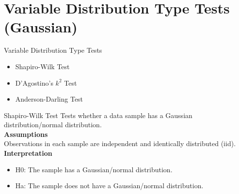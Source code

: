 


\maketitle
\section{Variable Distribution Type Tests (Gaussian)}

\begin{frame}[t]{Variable Distribution Type Tests}
	\begin{itemize}
		\item Shapiro-Wilk Test
		\item D’Agostino’s $k^{2}$ Test
		\item Anderson-Darling Test
	\end{itemize}
\end{frame}
\begin{frame}[t]{Shapiro-Wilk Test}
	Tests whether a data sample has a Gaussian distribution/normal distribution. \\
	\textbf{Assumptions}\\
		Observations in each sample are independent and identically distributed (iid).\\
	\textbf{Interpretation}	\\
	\begin{itemize}
		\item H0: The sample has a Gaussian/normal distribution.
		\item Ha: The sample does not have a Gaussian/normal distribution.
	\end{itemize}
\end{frame}
